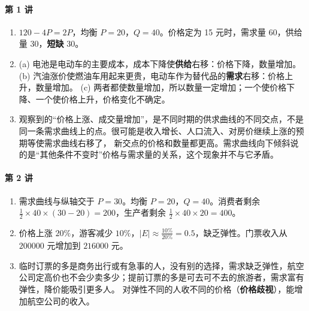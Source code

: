 \paragraph{第 1 讲}
\begin{enumerate}[label=1.\arabic*, leftmargin=2.6em]
  \item $120-4P=2P$，均衡 $P=20$，$Q=40$。价格定为 15 元时，需求量 60，供给量 30，\textbf{短缺} 30。
  \item (a) 电池是电动车的主要成本，成本下降使\textbf{供给}右移：价格下降，数量增加。
        (b) 汽油涨价使燃油车用起来更贵，电动车作为替代品的\textbf{需求}右移：价格上升，数量增加。
        (c) 两者都使数量增加，所以数量一定增加；一个使价格下降、一个使价格上升，价格变化不确定。
  \item 观察到的“价格上涨、成交量增加”，是不同时期的供求曲线的不同交点，不是同一条需求曲线上的点。很可能是收入增长、人口流入、对房价继续上涨的预期等使需求曲线右移了，
        新交点的价格和数量都更高。需求曲线向下倾斜说的是“其他条件不变时”价格与需求量的关系，这个现象并不与它矛盾。
\end{enumerate}

\paragraph{第 2 讲}
\begin{enumerate}[label=2.\arabic*, leftmargin=2.6em]
  \item 需求曲线与纵轴交于 $P=30$。均衡 $P=20$，$Q=40$。消费者剩余 $\frac12\times40\times(30-20)=200$，生产者剩余 $\frac12\times40\times20=400$。
  \item 价格上涨 $20\%$，游客减少 $10\%$，$|E|\approx\frac{10\%}{20\%}=0.5$，缺乏弹性。门票收入从 $200000$ 元增加到 $216000$ 元。
  \item 临时订票的多是商务出行或有急事的人，没有别的选择，需求缺乏弹性，航空公司定高价也不会少卖多少；提前订票的多是可去可不去的旅游者，需求富有弹性，降价能吸引更多人。
        对弹性不同的人收不同的价格（\textbf{价格歧视}），能增加航空公司的收入。
\end{enumerate}

